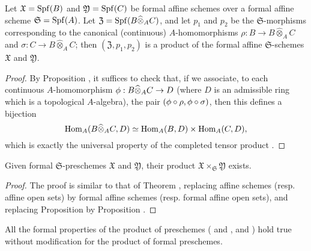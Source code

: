 \begin{proposition}[10.7.2]
\label{I.10.7.2}
Let $\mathfrak{X}=\operatorname{Spf}(B)$ and $\mathfrak{Y}=\operatorname{Spf}(C)$ be formal affine schemes over a formal affine scheme $\mathfrak{S}=\operatorname{Spf}(A)$.
Let $\mathfrak{Z}=\operatorname{Spf}(B\widehat{\otimes}_A C)$, and let $p_1$ and $p_2$ be the $\mathfrak{S}$-morphisms corresponding  to the canonical (continuous) $A$-homomorphisms $\rho: B\to B\widehat{\otimes}_A C$ and $\sigma:C\to B\widehat{\otimes}_A C$; then $(\mathfrak{Z},p_1,p_2)$ is a product of the formal affine $\mathfrak{S}$-schemes $\mathfrak{X}$ and $\mathfrak{Y}$.
\end{proposition}

\begin{proof}
By Proposition , it suffices to check that, if we associate, to each continuous $A$-homomorphism $\vphi:B\widehat{\otimes}_A C\to D$ (where $D$ is an admissible ring which is a topological $A$-algebra), the pair $(\phi\circ\rho,\phi\circ\sigma)$, then this defines a bijection
\[
  \operatorname{Hom}_A(B\widehat{\otimes}_A C,D)\simeq\operatorname{Hom}_A(B,D)\times\operatorname{Hom}_A(C,D),
\]
which is exactly the universal property of the completed tensor product .
\end{proof}

\begin{proposition}[10.7.3]
\label{I.10.7.3}
Given formal $\mathfrak{S}$-preschemes $\mathfrak{X}$ and $\mathfrak{Y}$, their product $\mathfrak{X}\times_\mathfrak{S}\mathfrak{Y}$ exists.
\end{proposition}

\begin{proof}
The proof is similar to that of Theorem , replacing affine schemes (resp. affine open sets) by formal affine schemes (resp. formal affine open sets), and replacing Proposition  by Proposition .
\end{proof}

All the formal properties of the product of preschemes ( and ,  and ) hold true without modification for the product of formal preschemes.

